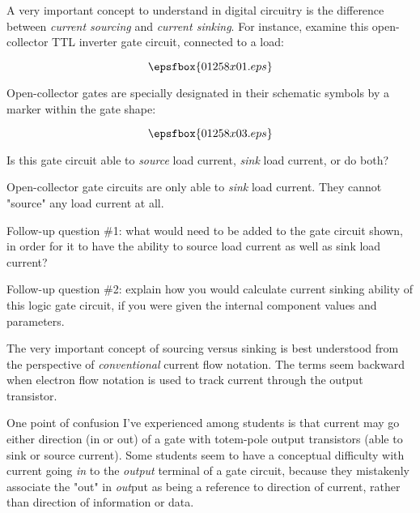 

A very important concept to understand in digital circuitry is the difference between {\it current sourcing} and {\it current sinking}.  For instance, examine this open-collector TTL inverter gate circuit, connected to a load:

$$\epsfbox{01258x01.eps}$$

Open-collector gates are specially designated in their schematic symbols by a marker within the gate shape:

$$\epsfbox{01258x03.eps}$$

Is this gate circuit able to {\it source} load current, {\it sink} load current, or do both?







Open-collector gate circuits are only able to {\it sink} load current.  They cannot "source" any load current at all.

\vskip 10pt

Follow-up question \#1: what would need to be added to the gate circuit shown, in order for it to have the ability to source load current as well as sink load current?

\vskip 10pt

Follow-up question \#2: explain how you would calculate current sinking ability of this logic gate circuit, if you were given the internal component values and parameters.







The very important concept of sourcing versus sinking is best understood from the perspective of {\it conventional} current flow notation.  The terms seem backward when electron flow notation is used to track current through the output transistor.

One point of confusion I've experienced among students is that current may go either direction (in or out) of a gate with totem-pole output transistors (able to sink or source current).  Some students seem to have a conceptual difficulty with current going {\it in} to the {\it output} terminal of a gate circuit, because they mistakenly associate the "out" in {\it out}put as being a reference to direction of current, rather than direction of information or data.

